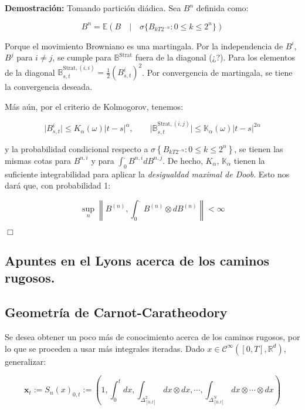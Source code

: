 \textbf{Demostración:} Tomando partición diádica. Sea $B^n$ definida como:

\[
	B^n = \mathbb{E}(B \quad \vert \quad \sigma\{ B_{kT 2^{-n}}  : 0 \leq k \leq 2^n  \})
\]

Porque el movimiento Browniano es una martingala. Por la independencia de $B^i$, $B^j$ para $i \neq j$, se cumple para $\mathbb{B}^{\text{Strat}}$ fuera de la diagonal (¿?). Para los elementos de la diagonal $\mathbb{B}^{\text{Strat}, (i,i)}_{s,t} = \frac{1}{2} (B_{s,t}^i)^2$. Por convergencia de martingala, se tiene la convergencia deseada.

Más aún, por el criterio de Kolmogorov, tenemos:

\[
	\lvert B^i_{s,t} \rvert \leq K_{\alpha} (\omega) \lvert t - s \rvert^{\alpha}, \qquad \lvert \mathbb{B}_{s,t}^{\text{Strat}, (i,j)} \rvert \leq \mathbb{K}_{\alpha} (\omega) \lvert t - s \rvert^{2\alpha}
\]

y la probabilidad condicional respecto a $\sigma \left\{ B_{kT2^{-n}} : 0 \leq k \leq 2^n \right\}$, se tienen las mismas cotas para $B^{n,i}$ y para $\int_0^{.} B^{n,i} dB^{n,j}$. De hecho, $K_{\alpha}$, $\mathbb{K}_{\alpha}$ tienen la suficiente integrabilidad para aplicar la \textit{desigualdad maximal de Doob}. Esto nos dará que, con probabilidad 1:

\[
	\sup_n \left\lVert B^{(n)}, \int_0^{.} B^{(n)} \otimes dB^{(n)} \right\rVert < \infty
\]

\begin{flushright}
	$\Box$
\end{flushright}


\subsection{Apuntes en el Lyons acerca de los caminos rugosos.}


\subsection{Geometría de Carnot-Caratheodory}

Se desea obtener un poco más de conocimiento acerca de los caminos rugosos, por lo que se proceden a usar más integrales iteradas. Dado $x \in \mathcal{C}^{\infty} ([0,T], \mathbb{R}^d)$, generalizar:

\[
	\mathbf{x}_t := S_n (x)_{0, t} := \left( 1, \int_0^t dx, \int_{\Delta_{[0,t]}^2 } dx \otimes dx, \cdots, \int_{ \Delta_{[0,t]}^N  } dx \otimes \cdots \otimes dx \right)
\]

